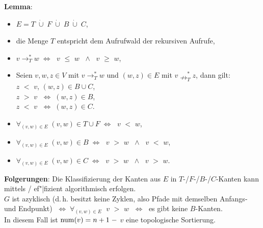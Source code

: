 \textbf{Lemma}:
\begin{itemize}
    \item
    $E = T \;\dot{\cup}\; F \;\dot{\cup}\; B \;\dot{\cup}\; C$,
    
    \item
    die Menge $T$ entspricht dem Aufrufwald der rekursiven Aufrufe,
    
    \item
    $v \rightarrow^\ast_T w \;\Leftrightarrow\;$
    \code{dfsnum[}$v$\code{]} $\le$ \code{dfsnum[}$w$\code{]} $\;\land\;$
    \code{compnum[}$v$\code{]} $\ge$ \code{compnum[}$w$\code{]},
    
    \item
    Seien $v, w, z \in V$ mit $v \rightarrow^\ast_T w$ und
    $(w, z) \in E$ mit $v \nrightarrow^\ast_T z$, dann gilt: \\
    \code{dfsnum[}$z$\code{]} $<$ \code{dfsnum[}$v$\code{]}, \qquad
    $(w, z) \in B \cup C$, \\
    \code{compnum[}$z$\code{]} $>$ \code{compnum[}$v$\code{]}
    $\;\Leftrightarrow\; (w, z) \in B$, \\
    \code{compnum[}$z$\code{]} $<$ \code{compnum[}$v$\code{]}
    $\;\Leftrightarrow\; (w, z) \in C$.
    
    \item
    $\forall_{(v, w) \in E}\; (v, w) \in T \cup F \;\Leftrightarrow\;$
    \code{dfsnum[}$v$\code{]} $<$ \code{dfsnum[}$w$\code{]},
    
    \item
    $\forall_{(v, w) \in E}\; (v, w) \in B \;\Leftrightarrow\;$
    \code{dfsnum[}$v$\code{]} $>$ \code{dfsnum[}$w$\code{]} $\;\land\;$
    \code{compnum[}$v$\code{]} $<$ \code{compnum[}$w$\code{]},
    
    \item
    $\forall_{(v, w) \in E}\; (v, w) \in C \;\Leftrightarrow\;$
    \code{dfsnum[}$v$\code{]} $>$ \code{dfsnum[}$w$\code{]} $\;\land\;$
    \code{compnum[}$v$\code{]} $>$ \code{compnum[}$w$\code{]}.
\end{itemize}

\linie

\textbf{Folgerungen}:
Die Klassifizierung der Kanten aus $E$ in $T$-/$F$-/$B$-/$C$-Kanten kann
mittels / ef"|fizient algorithmisch erfolgen. \\
$G$ ist azyklisch
(d.\,h. besitzt keine Zyklen, also Pfade mit demselben Anfangs- und Endpunkt)
$\;\Leftrightarrow\; \forall_{(v,w) \in E}\;$
\code{compnum[}$v$\code{]} $>$ \code{compnum[}$w$\code{]}
$\;\Leftrightarrow\;$ es gibt keine $B$-Kanten. \\
In diesem Fall ist $\operatorname{num}(v) = n + 1 \;-$ \code{compnum[}$v$\code{]}
eine topologische Sortierung.

